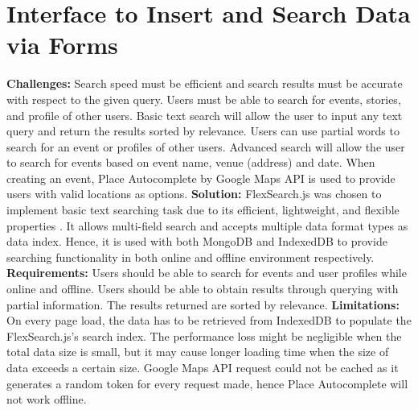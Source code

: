 \documentclass[11pt, a4paper]{article}
\begin{document}
\section{Interface to Insert and Search Data via Forms}
\textbf{Challenges:} Search speed must be efficient and search results must be
accurate with respect to the given query. Users must be able to search for events, stories, and
profile of other users. Basic text search will allow the user to input any text query and return the
results sorted by relevance. Users can use partial words to search for an event or profiles of other
users. Advanced search will allow the user to search for events based on event name, venue (address)
and date. When creating an event, Place Autocomplete by Google Maps API \cite{google_maps_api} is
used to provide users with valid locations as options. \textbf{Solution:} FlexSearch.js
\cite{flexsearch} was chosen to implement basic text searching task due to its efficient,
lightweight, and flexible properties \cite{flexsearch_benchmarkk}. It allows multi-field search and
accepts multiple data format types as data index. Hence, it is used with both MongoDB and IndexedDB
to provide searching functionality in both online and offline environment respectively.
\textbf{Requirements:} Users should be able to search for events and user profiles while online and
offline. Users should be able to obtain results through querying with partial information. The
results returned are sorted by relevance. \textbf{Limitations:} On every page load, the data has to
be retrieved from IndexedDB to populate the FlexSearch.js's search index. The performance loss might
be negligible when the total data size is small, but it may cause longer loading time when the size
of data exceeds a certain size. Google Maps API request could not be cached as it generates a random
token for every request made, hence Place Autocomplete will not work offline.
\end{document}
